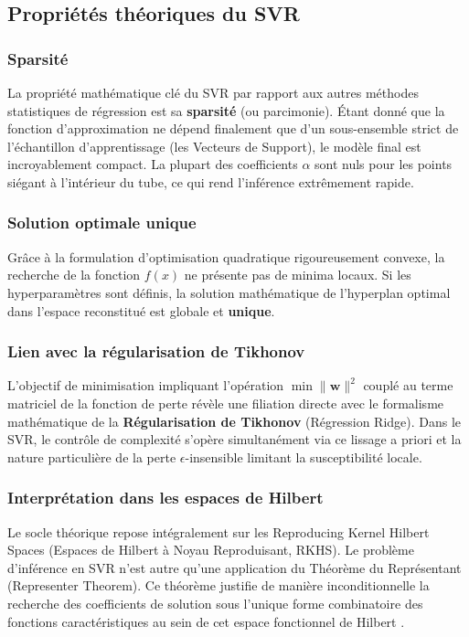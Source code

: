 \subsection{Propriétés théoriques du SVR}

\subsubsection{Sparsité}
La propriété mathématique clé du SVR par rapport aux autres méthodes statistiques de régression est sa \textbf{sparsité} (ou parcimonie). Étant donné que la fonction d'approximation ne dépend finalement que d'un sous-ensemble strict de l'échantillon d'apprentissage (les Vecteurs de Support), le modèle final est incroyablement compact. La plupart des coefficients $\alpha$ sont nuls pour les points siégant à l'intérieur du tube, ce qui rend l'inférence extrêmement rapide.

\subsubsection{Solution optimale unique}
Grâce à la formulation d'optimisation quadratique rigoureusement convexe, la recherche de la fonction $f(x)$ ne présente pas de minima locaux. Si les hyperparamètres sont définis, la solution mathématique de l'hyperplan optimal dans l'espace reconstitué est globale et \textbf{unique}.

\subsubsection{Lien avec la régularisation de Tikhonov}
L'objectif de minimisation impliquant l'opération $\min \|\mathbf{w}\|^2$ couplé au terme matriciel de la fonction de perte révèle une filiation directe avec le formalisme mathématique de la \textbf{Régularisation de Tikhonov} (Régression Ridge). Dans le SVR, le contrôle de complexité s'opère simultanément via ce lissage a priori et la nature particulière de la perte $\epsilon$-insensible limitant la susceptibilité locale.

\subsubsection{Interprétation dans les espaces de Hilbert}
Le socle théorique repose intégralement sur les Reproducing Kernel Hilbert Spaces (Espaces de Hilbert à Noyau Reproduisant, RKHS). Le problème d'inférence en SVR n'est autre qu'une application du Théorème du Représentant (Representer Theorem). Ce théorème justifie de manière inconditionnelle la recherche des coefficients de solution sous l'unique forme combinatoire des fonctions caractéristiques au sein de cet espace fonctionnel de Hilbert \citep{scholkopf2001generalized}.

